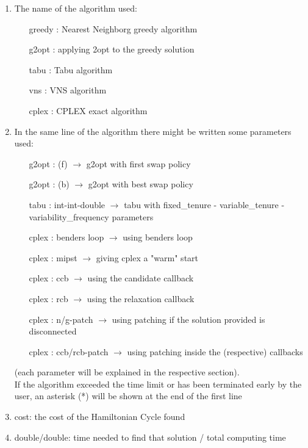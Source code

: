 \begin{enumerate}
    \item The name of the algorithm used:
    \begin{enumerate}
        \item[greedy]: Nearest Neighborg greedy algorithm
        \item[g2opt]: applying 2opt to the greedy solution
        \item[tabu]: Tabu algorithm
        \item[vns]: VNS algorithm
        \item[cplex]: CPLEX exact algorithm
    \end{enumerate}
    \item In the same line of the algorithm there might be written some parameters used:
    \begin{enumerate}
        \item[g2opt]: (f) $\rightarrow$ g2opt with first swap policy
        \item[g2opt]: (b) $\rightarrow$ g2opt with best swap policy
        \item[tabu]: int-int-double $\rightarrow$ tabu with fixed\_tenure - variable\_tenure - variability\_frequency parameters
        \item[cplex]: benders loop $\rightarrow$ using benders loop
        \item[cplex]: mipst $\rightarrow$ giving cplex a "warm" start
        \item[cplex]: ccb $\rightarrow$ using the candidate callback
        \item[cplex]: rcb $\rightarrow$ using the relaxation callback
        \item[cplex]: n/g-patch $\rightarrow$ using patching if the solution provided is disconnected
        \item[cplex]: ccb/rcb-patch $\rightarrow$ using patching inside the (respective) callbacks
    \end{enumerate}
    (each parameter will be explained in the respective section).\\
    If the algorithm exceeded the time limit or has been terminated early by the user, an asterisk (*) will be shown at the end of the first line
    \item cost: the cost of the Hamiltonian Cycle found
    \item double/double: time needed to find that solution / total computing time
\end{enumerate}

